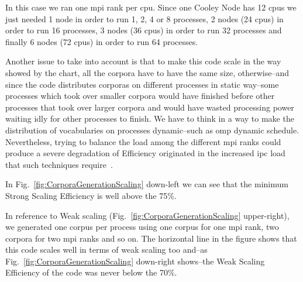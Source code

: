 \documentclass[11pt,a4paper]{article}
\begin{document}
In this case we ran one \gls{mpi} rank per \gls{cpu}. Since one Cooley Node has 12 \glspl{cpu} we just needed 1 node in order to run 1, 2, 4 or 8 processes, 2 nodes (24 \glspl{cpu}) in order to run 16 processes, 3 nodes (36 \glspl{cpu}) in order to run 32 processes and finally 6 nodes (72 \glspl{cpu}) in order to run 64 processes.

Another issue to take into account is that to make this code scale in the way showed by the chart, all the corpora have to have the same size, otherwise--and since the code distributes corporas on different processes in static way--some processes which took over smaller corpora would have finished before other processes that took over larger corpora and would have wasted processing power waiting idly for other processes to finish. We have to think in a way to make the distribution of vocabularies on processes dynamic--such as \gls{omp} dynamic schedule. Nevertheless, trying to balance the load among the different \gls{mpi} ranks could produce a severe degradation of Efficiency originated in the increased \gls{ipc} load that such techniques require~\cite{hu2012biophysically}.~

In Fig.~\ref{fig:CorporaGenerationScaling} down-left we can see that the minimum Strong Scaling Efficiency is well above the 75\%.  

In reference to Weak scaling (Fig.~\ref{fig:CorporaGenerationScaling} upper-right), we generated one corpus per process using one corpus for one \gls{mpi} rank, two corpora for two \gls{mpi} ranks and so on. The horizontal line in the figure shows that this code scales well  in terms of weak scaling too and--as Fig.~\ref{fig:CorporaGenerationScaling} down-right shows--the Weak Scaling Efficiency of the code was never below the 70\%.

\end{document}
